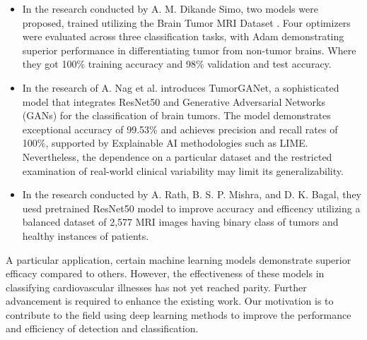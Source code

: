 \begin{itemize}
\item In the research conducted by A. M. Dikande Simo, two models were proposed, trained utilizing the Brain Tumor MRI Dataset \cite{b27}. Four optimizers were evaluated across three classification tasks, with Adam demonstrating superior performance in differentiating tumor from non-tumor brains.
Where they got 100\% training accuracy and 98\% validation and test accuracy.

\item In the research of \cite{b28} A. Nag et al. introduces TumorGANet, a sophisticated model that integrates ResNet50 and Generative Adversarial Networks (GANs) for the classification of brain tumors. The model demonstrates exceptional accuracy of 99.53\% and achieves precision and recall rates of 100\%, supported by Explainable AI methodologies such as LIME. Nevertheless, the dependence on a particular dataset and the restricted examination of real-world clinical variability may limit its generalizability.

\item In the research conducted by  A. Rath, B. S. P. Mishra, and D. K. Bagal,\cite{b29} they uesd pretrained ResNet50 model to improve  accuracy and efficency utilizing a balanced dataset of 2,577 MRI images having binary class of tumors and healthy instances of patients.

\end{itemize}
A particular application, certain machine learning models demonstrate superior efficacy compared to others. However, the effectiveness of these models in classifying cardiovascular illnesses has not yet reached parity. Further advancement is required to enhance the existing work. Our motivation is to contribute to the field using deep learning methods to improve the performance and efficiency of detection and classification.